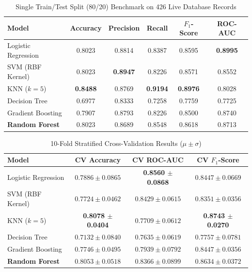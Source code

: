 \documentclass[conference]{IEEEtran}
\begin{document}
\begin{table}[H]
\caption{Single Train/Test Split (80/20) Benchmark on 426 Live Database Records}
\label{tab:single_split}
\centering
\begin{tabular}{lccccc}
\toprule
\textbf{Model} & \textbf{Accuracy} & \textbf{Precision} & \textbf{Recall} & \textbf{$F_1$-Score} & \textbf{ROC-AUC} \\
\midrule
Logistic Regression & 0.8023 & 0.8814 & 0.8387 & 0.8595 & \textbf{0.8995} \\
SVM (RBF Kernel) & 0.8023 & \textbf{0.8947} & 0.8226 & 0.8571 & 0.8552 \\
KNN ($k=5$) & \textbf{0.8488} & 0.8769 & \textbf{0.9194} & \textbf{0.8976} & 0.8028 \\
Decision Tree & 0.6977 & 0.8333 & 0.7258 & 0.7759 & 0.7725 \\
Gradient Boosting & 0.7907 & 0.8793 & 0.8226 & 0.8500 & 0.8740 \\
\textbf{Random Forest} & 0.8023 & 0.8689 & 0.8548 & 0.8618 & 0.8713 \\
\bottomrule
\end{tabular}
\end{table}

\begin{table}[H]
\caption{10-Fold Stratified Cross-Validation Results ($\mu \pm \sigma$)}
\label{tab:cv_results}
\centering
\begin{tabular}{lccc}
\toprule
\textbf{Model} & \textbf{CV Accuracy} & \textbf{CV ROC-AUC} & \textbf{CV $F_1$-Score} \\
\midrule
Logistic Regression & $0.7886 \pm 0.0865$ & \textbf{0.8560 $\pm$ 0.0868} & $0.8447 \pm 0.0669$ \\
SVM (RBF Kernel) & $0.7724 \pm 0.0462$ & $0.8429 \pm 0.0615$ & $0.8351 \pm 0.0356$ \\
KNN ($k=5$) & \textbf{0.8078 $\pm$ 0.0404} & $0.7709 \pm 0.0612$ & \textbf{0.8743 $\pm$ 0.0270} \\
Decision Tree & $0.7132 \pm 0.0840$ & $0.7635 \pm 0.0619$ & $0.7757 \pm 0.0781$ \\
Gradient Boosting & $0.7746 \pm 0.0495$ & $0.7939 \pm 0.0792$ & $0.8447 \pm 0.0356$ \\
\textbf{Random Forest} & $0.8053 \pm 0.0518$ & $0.8366 \pm 0.0899$ & $0.8634 \pm 0.0372$ \\
\bottomrule
\end{tabular}
\end{table}
\end{document}
